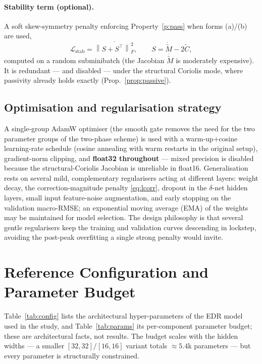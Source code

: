 \documentclass[11pt]{article}
\newcommand{\Mt}{\tilde{M}}
\newcommand{\Ct}{\tilde{C}}
\newcommand{\norm}[1]{\left\lVert #1 \right\rVert}
\newcommand{\transp}{^{\top}}
\theoremstyle{definition}
\theoremstyle{plain}
\begin{document}
\paragraph{Stability term (optional).}
A soft skew-symmetry penalty enforcing Property~\ref{p:pass} when forms (a)/(b)
are used,
\begin{equation}
\mathcal L_{\mathrm{stab}}=\overline{\norm{S+S\transp}_F^2},\qquad S=\dot{\Mt}-2\Ct,
\end{equation}
computed on a random subminibatch (the Jacobian $\dot{\Mt}$ is moderately
expensive). It is redundant --- and disabled --- under the structural Coriolis
mode, where passivity already holds exactly (Prop.~\ref{prop:passive}).

\subsection{Optimisation and regularisation strategy}
A single-group AdamW optimiser (the smooth gate removes the need for the two
parameter groups of the two-phase scheme) is used with a warm-up$+$cosine
learning-rate schedule (cosine annealing with warm restarts in the original
setup), gradient-norm clipping, and \textbf{float32 throughout} --- mixed
precision is disabled because the structural-Coriolis Jacobian is unreliable in
float16. Generalisation rests on several mild, complementary regularisers acting
at different layers: weight decay, the correction-magnitude penalty
\eqref{eq:lcorr}, dropout in the $\delta$-net hidden layers, small input
feature-noise augmentation, and early stopping on the validation macro-RMSE; an
exponential moving average (EMA) of the weights may be maintained for model
selection. The design philosophy is that several gentle regularisers keep the
training and validation curves descending in lockstep, avoiding the post-peak
overfitting a single strong penalty would invite.

\section{Reference Configuration and Parameter Budget}
Table~\ref{tab:config} lists the architectural hyper-parameters of the EDR model
used in the study, and Table~\ref{tab:params} its per-component parameter budget;
these are architectural facts, not results. The budget scales with the hidden
widths --- a smaller $[32,32]/[16,16]$ variant totals $\approx5.4$k parameters ---
but every parameter is structurally constrained.
\end{document}
